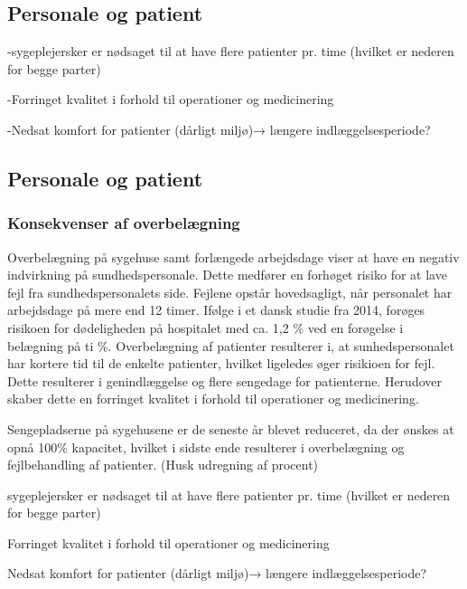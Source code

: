 \subsection{Personale og patient}

-sygeplejersker er nødsaget til at have flere patienter pr. time (hvilket er nederen for begge parter) 

-Forringet kvalitet i forhold til operationer og medicinering 

-Nedsat komfort for patienter (dårligt miljø)→ længere indlæggelsesperiode?

\subsection{Personale og patient}

\subsubsection{Konsekvenser af overbelægning}

Overbelægning på sygehuse samt forlængede arbejdsdage viser at have en negativ indvirkning på sundhedspersonale. Dette medfører en forhøget risiko for at lave fejl fra sundhedspersonalets side. Fejlene opstår hovedsagligt, når personalet har arbejdsdage på mere end 12 timer.\citep{forogelse2004} Ifølge i et dansk studie fra 2014, forøges risikoen for dødeligheden på hospitalet med ca. 1,2 \% ved en forøgelse i belægning på ti \%.\citep{dodelighed2014} Overbelægning af patienter resulterer i, at sunhedspersonalet har kortere tid til de enkelte patienter, hvilket ligeledes øger risikioen for fejl. Dette resulterer i genindlæggelse og flere sengedage for patienterne. Herudover skaber dette en forringet kvalitet i forhold til operationer og medicinering.

Sengepladserne på sygehusene er de seneste år blevet reduceret, da der ønskes at opnå 100\% kapacitet, hvilket i sidste ende resulterer i overbelægning og fejlbehandling af patienter. (Husk udregning af procent)




sygeplejersker er nødsaget til at have flere patienter pr. time (hvilket er nederen for begge parter)

Forringet kvalitet i forhold til operationer og medicinering 

Nedsat komfort for patienter (dårligt miljø)→ længere indlæggelsesperiode?
 